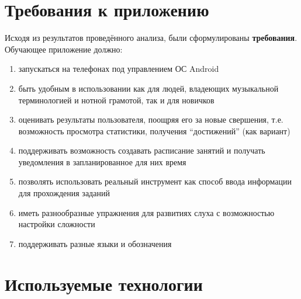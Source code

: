 \section{Требования к приложению}
Исходя из результатов проведённого анализа, были сформулированы \textbf{требования}. Обучающее приложение должно: 
\begin{enumerate}
\item запускаться на телефонах под управлением ОС Android
\item быть удобным в использовании как для людей, владеющих музыкальной терминологией и нотной грамотой, так и для новичков
\item оценивать результаты пользователя, поощряя его за новые свершения, т.е. возможность просмотра статистики, получения “достижений” (как вариант)
\item поддерживать возможность создавать расписание занятий и получать уведомления в запланированное для них время
\item позволять использовать реальный инструмент как способ ввода информации для прохождения заданий
\item иметь разнообразные упражнения для развитиях слуха с возможностью настройки сложности 
\item поддерживать разные языки и обозначения
\end{enumerate}\par
\section{Используемые технологии}